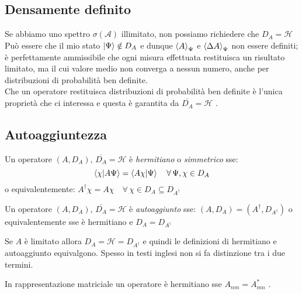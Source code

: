 \subsection{Densamente definito}

Se abbiamo uno spettro \(\sigma(\mathcal{A})\) illimitato, non possiamo richiedere che \(D_A = \mathcal{H}\)\\
Può essere che il mio stato \(\ket{\Psi} \notin D_A\) e dunque \(\expval{A}_{\Psi}\) e \(\expval{\Delta A}_{\Psi}\) non essere definiti; 
è perfettamente ammissibile che ogni misura effettuata restituisca un risultato limitato, ma il cui valore medio non converga a nessun numero,
anche per distribuzioni di probabilità ben definite.\\
Che un operatore restituisca distribuzioni di probabilità ben definite è l'unica proprietà che ci interessa e questa è garantita da \(\overline{D_A}= \mathcal{H}\) .

\subsection{Autoaggiuntezza}
\begin{definition}
    Un operatore \((A, D_A)\), \(\overline{D_A}= \mathcal{H}\) è \textit{hermitiano} o \textit{simmetrico} sse:
    \begin{equation}
        \braket{\chi}{A\Psi}   = \braket{A\chi}{\Psi} \quad \forall\, \Psi, \chi \in D_A
    \end{equation}  
    o equivalentemente: \(A^\dagger\chi = A\chi \quad   \forall\,\chi   \in D_A\subseteq D_{A^\dagger}\)
\end{definition}
\begin{definition}
    Un operatore \((A, D_A)\), \(\overline{D_A}= \mathcal{H}\) è \textit{autoaggiunto} sse: \((A, D_A)= (A^\dagger, D_{A^\dagger})\) 
    o equivalentemente sse è hermitiano e \(D_A= D_{A^\dagger}\)
\end{definition}

\begin{remark}
    Se \(A \) è limitato allora \(D_A = \mathcal{H}= D_{A^\dagger}\) e quindi le definizioni di hermitiano e autoaggiunto equivalgono.
    Spesso in testi inglesi non si fa distinzione tra i due termini.
\end{remark}
\begin{remark}
    In rappresentazione matriciale un operatore è hermitiano sse \(A_{nm}= A_{mn}^*\) .
\end{remark}


